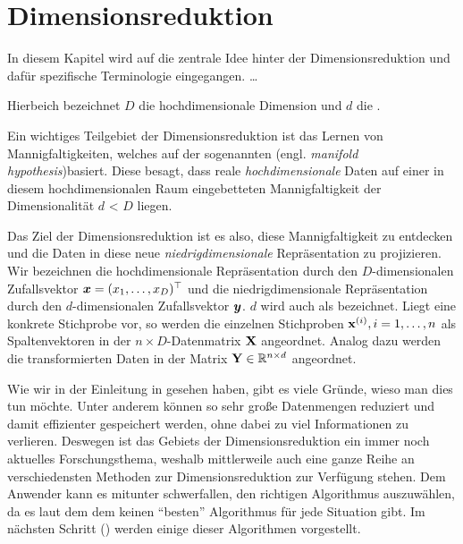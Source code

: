 \chapter{Dimensionsreduktion}
\label{ch:Dimensionsreduktion}

In diesem Kapitel wird auf die zentrale Idee hinter der Dimensionsreduktion und dafür spezifische Terminologie eingegangen. \ldots{}

Hierbeich bezeichnet $D$ die hochdimensionale Dimension und $d$ die .

Ein wichtiges Teilgebiet der Dimensionsreduktion ist das Lernen von Mannigfaltigkeiten, welches auf der sogenannten  (engl. \textit{manifold hypothesis})\addref basiert. Diese besagt, dass
reale \textit{hochdimensionale} Daten auf einer in diesem hochdimensionalen Raum eingebetteten Mannigfaltigkeit der Dimensionalität $d$ < $D$ liegen.\addref
{}

Das Ziel der Dimensionsreduktion ist es also, diese Mannigfaltigkeit zu entdecken und die Daten in diese neue \textit{niedrigdimensionale} Repräsentation zu projizieren. Wir bezeichnen die hochdimensionale Repräsentation durch den $D$-dimensionalen Zufallsvektor $\bm{x} = (x_1, \ldots, x_D)^\top$ und die niedrigdimensionale Repräsentation durch den $d$-dimensionalen Zufallsvektor $\bm{y}$.
$d$ wird auch als  bezeichnet. Liegt eine konkrete Stichprobe vor, so werden die einzelnen Stichproben $\mathbf{x}^{(i)}, i = 1,\ldots,n$ als Spaltenvektoren in der $n \times D$-Datenmatrix $\mathbf{X}$ angeordnet. Analog dazu werden die transformierten Daten in der Matrix $\mathbf{Y} \in \mathbb{R}^{n \times d}$ angeordnet.

Wie wir in der Einleitung in  gesehen haben, gibt es viele Gründe, wieso man dies tun möchte. Unter anderem können so sehr große Datenmengen reduziert und damit effizienter gespeichert werden, ohne dabei zu viel Informationen zu verlieren. Deswegen ist das Gebiets der Dimensionsreduktion ein immer noch aktuelles Forschungsthema, weshalb mittlerweile auch eine ganze Reihe an verschiedensten Methoden zur Dimensionsreduktion zur Verfügung stehen. Dem Anwender kann es mitunter schwerfallen, den richtigen Algorithmus auszuwählen, da es laut dem dem \addref keinen \enquote{besten} Algorithmus für jede Situation gibt. Im nächsten Schritt () werden einige dieser Algorithmen vorgestellt.



